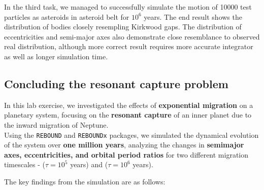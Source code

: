 \documentclass[12pt,a4paper]{article}
\begin{document}
  In the third task, we managed to successfully simulate the motion of 10000 test particles as asteroids in asteroid belt for $10^6$ years. The end result shows the distribution of bodies closely resempling Kirkwood gaps. 
  The distribution of eccentricities and semi-major axes also demonstrate close resemblance to observed real distribution, although more correct result requires more accurate integrator as well as longer simulation time.
\subsection{Concluding the resonant capture problem}
In this lab exercise, we investigated the effects of \textbf{exponential migration} on a planetary system, focusing on the \textbf{resonant capture} of an inner planet due to the inward migration of Neptune.
\\ Using the \texttt{REBOUND} and \texttt{REBOUNDx} packages, we simulated the dynamical evolution of the system over \textbf{one million years}, analyzing the changes in \textbf{semimajor axes, eccentricities, and orbital period ratios} for two different migration timescales - (\(\tau = 10^5\) years) and (\(\tau = 10^6\) years).

\noindent The key findings from the simulation are as follows:
\end{document}
